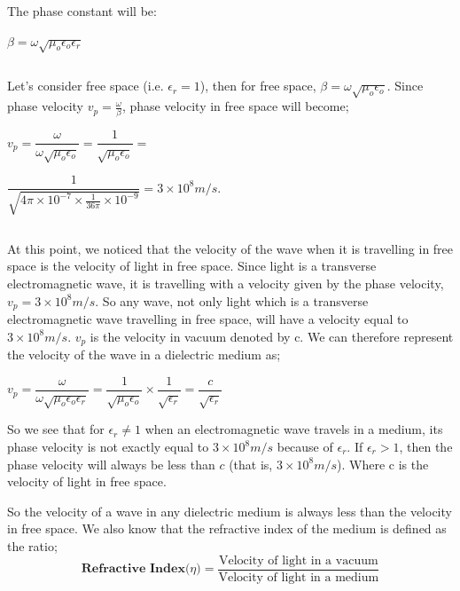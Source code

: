 The phase constant will be:

\begin{center}
$\beta=\omega\sqrt{\mu_{o}\epsilon_{o}\epsilon_{r}}$ 
\end{center}
\begin{equation}\end{equation}

Let's consider free space (i.e. $\epsilon_{r}=1 $), then for free space, $\beta=\omega\sqrt{\mu_{o}\epsilon_{o}}$.
Since phase velocity $v_p=\frac{\omega}{\beta}$, phase velocity in free space will become;

$v_p=\dfrac{\omega}{\omega\sqrt{\mu_{o}\epsilon_{o}}}=\dfrac{1}{\sqrt{\mu_{o}\epsilon_{o}}}=$ 

$\dfrac{1}{\sqrt{4\pi\times 10^{-7}\times \frac{1}{36\pi}\times 10^{-9}}}=3\times 10^{8}m/s.$

\begin{equation}\end{equation}

At this point, we noticed that the velocity of the wave when it is travelling in free space is the velocity of light in free space. Since light is a transverse electromagnetic wave, it is travelling with a velocity given by the phase velocity, $v_{p} = 3\times 10^{8}m/s$. So any wave, not only light which is a transverse electromagnetic wave travelling in free space, will have a velocity equal to $3\times 10^{8}m/s$. $v_p$ is the velocity in vacuum denoted by c.
We can therefore represent the velocity of the wave in a dielectric medium as;

$v_p=\dfrac{\omega}{\omega\sqrt{\mu_{o}\epsilon_{o}\epsilon_{r}}}=\dfrac{1}{\sqrt{\mu_{o}\epsilon_{o}}}\times \dfrac{1}{\sqrt{\epsilon_{r}}}=\dfrac{c}{\sqrt{\epsilon_{r}}}$
\begin{equation}\end{equation}

So we see that for $\epsilon_{r}\neq 1$ when an electromagnetic wave travels in a medium, its phase velocity is not exactly equal to  $3\times 10^{8}m/s$ because of $\epsilon_{r}$. If $\epsilon_{r}>1$, then the phase velocity will always be less than $c$ (that is, $3\times 10^{8}m/s$). Where c is the velocity of light in free space.

So the velocity of a wave in any dielectric medium is always less than the velocity in free space. We also know that the refractive index of the medium is defined as the ratio;
\begin{equation}
\textbf{Refractive Index($\eta$)} =	\dfrac{\text{Velocity of light in a vacuum}}{\text{Velocity of light in a medium}}
\end{equation}
\begin{equation}\end{equation}

